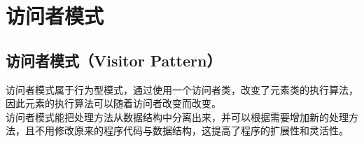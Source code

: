 \newpage

\section{访问者模式}

\subsection{访问者模式（Visitor Pattern）}

访问者模式属于行为型模式，通过使用一个访问者类，改变了元素类的执行算法，因此元素的执行算法可以随着访问者改变而改变。\\

访问者模式能把处理方法从数据结构中分离出来，并可以根据需要增加新的处理方法，且不用修改原来的程序代码与数据结构，这提高了程序的扩展性和灵活性。\\

\\

